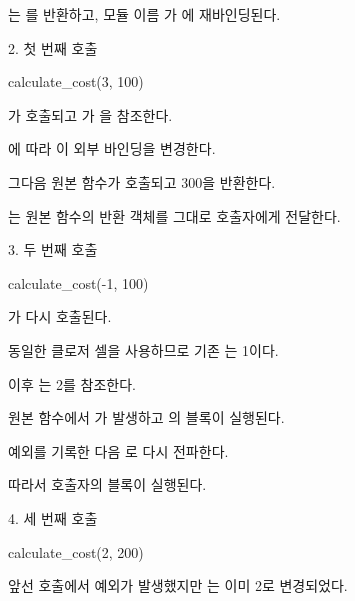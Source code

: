 는 를 반환하고, 모듈 이름 가 에 재바인딩된다.

\begin{dhknote}
\begin{dhksmry}[centered]
2. 첫 번째 호출
\end{dhksmry}
\end{dhknote}

\begin{dhkcode}
calculate_cost(3, 100)
\end{dhkcode}

가 호출되고 가 을 참조한다.

에 따라 이 외부 바인딩을 변경한다.

그다음 원본 함수가 호출되고 300을 반환한다.

는 원본 함수의 반환 객체를 그대로 호출자에게 전달한다.

\begin{dhknote}
\begin{dhksmry}[centered]
3. 두 번째 호출
\end{dhksmry}
\end{dhknote}

\begin{dhkcode}
calculate_cost(-1, 100)
\end{dhkcode}

가 다시 호출된다.

동일한 클로저 셀을 사용하므로 기존 는 1이다.

 이후 는 2를 참조한다.

원본 함수에서 가 발생하고 의  블록이 실행된다.

예외를 기록한 다음 로 다시 전파한다.

따라서 호출자의  블록이 실행된다.

\begin{dhknote}
\begin{dhksmry}[centered]
4. 세 번째 호출
\end{dhksmry}
\end{dhknote}

\begin{dhkcode}
calculate_cost(2, 200)
\end{dhkcode}

앞선 호출에서 예외가 발생했지만 는 이미 2로 변경되었다.

